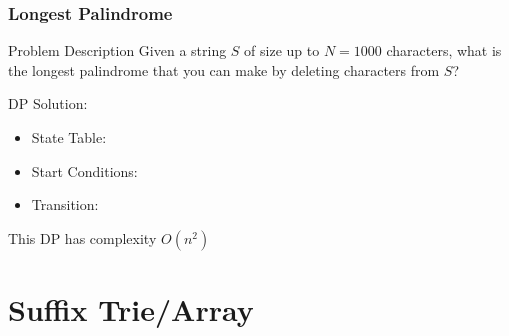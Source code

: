\documentclass{beamer}
\begin{document}
\begin{frame}
  \frametitle{Longest Palindrome}
  {\smaller
    \begin{block}{Problem Description}
      Given a string $S$ of size up to $N = 1000$ characters, what is the
      longest palindrome that you can make by deleting characters from $S$?
    \end{block}

    DP Solution:
    \begin{itemize}
    \item State Table: 
    \item Start Conditions: 
    \item Transition: 
    \end{itemize}

    This DP has complexity $O(n^2)$

  }
\end{frame}


\section{Suffix Trie/Array} %
\end{document}
